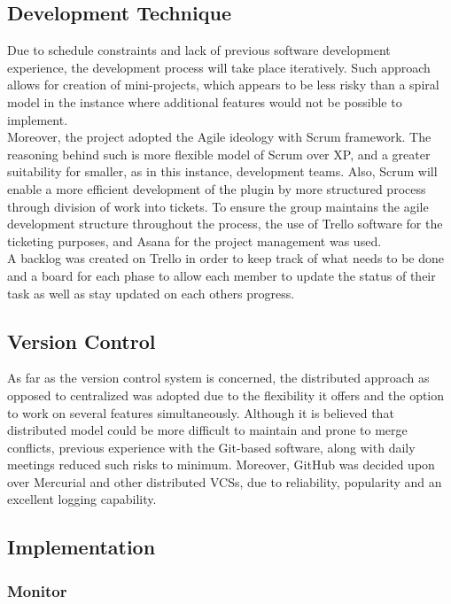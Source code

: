 \documentclass[a4paper,11pt]{article}
\begin{document}
\subsection{Development Technique}
Due to schedule constraints and lack of previous software development experience, the development process will take place iteratively\cite{SoftwareEngineering}. Such approach allows for creation of mini-projects, which appears to be less risky than a spiral model in the instance where additional features would not be possible to implement. 
\\ 
\indent Moreover, the project adopted the Agile ideology\cite{Scrum} with Scrum framework. The reasoning behind such is more flexible model of Scrum over XP, and a greater suitability for smaller, as in this instance, development teams. Also, Scrum will enable a more efficient development of the plugin by more structured process through division of work into tickets. To ensure the group maintains the agile development structure throughout the process, the use of Trello\cite{trello} software for the ticketing purposes, and Asana\cite{asana} for the project management was used.
\\
\indent A backlog was created on Trello in order to keep track of what needs to be done and a board for each phase to allow each member to update the status of their task as well as stay updated on each others progress.

\subsection{Version Control}
As far as the version control system is concerned, the distributed approach as opposed to centralized was adopted due to the flexibility it offers and the option to work on several features simultaneously\cite{Design}. Although it is believed that distributed model could be more difficult to maintain and prone to merge conflicts\cite{Design}, previous experience with the Git-based software, along with daily meetings reduced such risks to minimum. Moreover, GitHub was decided upon over Mercurial and other distributed VCSs, due to reliability, popularity and an excellent logging capability\cite{GitHub}.

\subsection{Implementation}

\subsubsection{Monitor}
\end{document}
